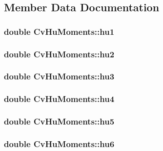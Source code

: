 \subsection{Member Data Documentation}
\hypertarget{structCvHuMoments_aa450f3037cf35f767b4159b67e6adb8f}{
\subsubsection[{hu1}]{\setlength{\rightskip}{0pt plus 5cm}double Cv\-Hu\-Moments\-::hu1}}\label{structCvHuMoments_aa450f3037cf35f767b4159b67e6adb8f}
\hypertarget{structCvHuMoments_a1f87365eec104c58b5bf26e36fed7f0e}{
\subsubsection[{hu2}]{\setlength{\rightskip}{0pt plus 5cm}double Cv\-Hu\-Moments\-::hu2}}\label{structCvHuMoments_a1f87365eec104c58b5bf26e36fed7f0e}
\hypertarget{structCvHuMoments_a44baeeb2c6cef51d5000fa1bd21777aa}{
\subsubsection[{hu3}]{\setlength{\rightskip}{0pt plus 5cm}double Cv\-Hu\-Moments\-::hu3}}\label{structCvHuMoments_a44baeeb2c6cef51d5000fa1bd21777aa}
\hypertarget{structCvHuMoments_a3eb32d23887e8da1425f412b514cb98d}{
\subsubsection[{hu4}]{\setlength{\rightskip}{0pt plus 5cm}double Cv\-Hu\-Moments\-::hu4}}\label{structCvHuMoments_a3eb32d23887e8da1425f412b514cb98d}
\hypertarget{structCvHuMoments_a9a03659c41d3bca145239fee5334a9bf}{
\subsubsection[{hu5}]{\setlength{\rightskip}{0pt plus 5cm}double Cv\-Hu\-Moments\-::hu5}}\label{structCvHuMoments_a9a03659c41d3bca145239fee5334a9bf}
\hypertarget{structCvHuMoments_a1a16e0bde3e4b3b5f5245240c76f3387}{
\subsubsection[{hu6}]{\setlength{\rightskip}{0pt plus 5cm}double Cv\-Hu\-Moments\-::hu6}}\label{structCvHuMoments_a1a16e0bde3e4b3b5f5245240c76f3387}
